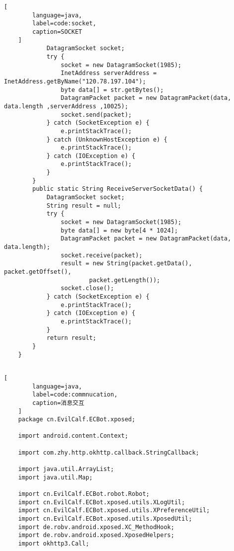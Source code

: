 \begin{appendices}
\begin{lstlisting}[
        language=java,
        label=code:socket,
        caption=SOCKET
    ]
            DatagramSocket socket;
            try {
                socket = new DatagramSocket(1985);
                InetAddress serverAddress = InetAddress.getByName("120.78.197.104");
                byte data[] = str.getBytes();
                DatagramPacket packet = new DatagramPacket(data, data.length ,serverAddress ,10025);
                socket.send(packet);
            } catch (SocketException e) {
                e.printStackTrace();
            } catch (UnknownHostException e) {
                e.printStackTrace();
            } catch (IOException e) {
                e.printStackTrace();
            }
        }
        public static String ReceiveServerSocketData() {
            DatagramSocket socket;
            String result = null;
            try {
                socket = new DatagramSocket(1985);
                byte data[] = new byte[4 * 1024];
                DatagramPacket packet = new DatagramPacket(data, data.length);
                socket.receive(packet);
                result = new String(packet.getData(), packet.getOffset(),
                        packet.getLength());
                socket.close();
            } catch (SocketException e) {
                e.printStackTrace();
            } catch (IOException e) {
                e.printStackTrace();
            }
            return result;
        }
    }
    
    \end{lstlisting}
    \begin{lstlisting}[
        language=java,
        label=code:commnucation,
        caption=消息交互
    ]
    package cn.EvilCalf.ECBot.xposed;

    import android.content.Context;
    
    import com.zhy.http.okhttp.callback.StringCallback;
    
    import java.util.ArrayList;
    import java.util.Map;
    
    import cn.EvilCalf.ECBot.robot.Robot;
    import cn.EvilCalf.ECBot.xposed.utils.XLogUtil;
    import cn.EvilCalf.ECBot.xposed.utils.XPreferenceUtil;
    import cn.EvilCalf.ECBot.xposed.utils.XposedUtil;
    import de.robv.android.xposed.XC_MethodHook;
    import de.robv.android.xposed.XposedHelpers;
    import okhttp3.Call;
    

\end{lstlisting}
\end{appendices}
